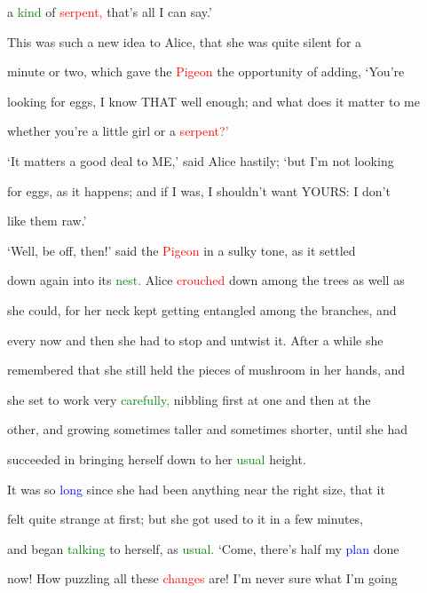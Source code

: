  a \textcolor{green}{kind} of \textcolor{red}{serpent,} that’s all I can say.’



 This was such a new idea to Alice, that she was quite silent for a

 minute or two, which gave the \textcolor{red}{Pigeon} the \textcolor{BurntOrange}{opportunity} of adding, ‘You’re

 looking for eggs, I know THAT well enough; and what does it matter to me

 whether you’re a little girl or a \textcolor{red}{serpent?’}



 ‘It matters a \textcolor{BurntOrange}{good} \textcolor{BurntOrange}{deal} to ME,’ said Alice hastily; ‘but I’m not looking

 for eggs, as it happens; and if I was, I shouldn’t want YOURS: I don’t

 like them raw.’



 ‘Well, be off, then!’ said the \textcolor{red}{Pigeon} in a sulky tone, as it settled

 down again into its \textcolor{green}{nest.} Alice \textcolor{red}{crouched} down among the \textcolor{BurntOrange}{trees} as well as

 she could, for her neck kept getting entangled among the branches, and

 every now and then she had to stop and untwist it. After a while she

 remembered that she still held the pieces of mushroom in her hands, and

 she set to work very \textcolor{green}{carefully,} nibbling first at one and then at the

 other, and \textcolor{BurntOrange}{growing} sometimes taller and sometimes shorter, until she had

 \textcolor{BurntOrange}{succeeded} in bringing herself down to her \textcolor{green}{usual} height.



 It was so \textcolor{blue}{long} since she had been anything near the right size, that it

 felt quite strange at first; but she got used to it in a few minutes,

 and began \textcolor{green}{talking} to herself, as \textcolor{green}{usual.} ‘Come, there’s half my \textcolor{blue}{plan} done

 now! How puzzling all these \textcolor{red}{changes} are! I’m never sure what I’m going

